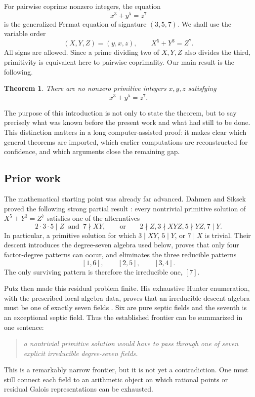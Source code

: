 \documentclass[11pt]{article}
\newtheorem{theorem}{Theorem}[section]
\theoremstyle{definition}
\theoremstyle{remark}
\begin{document}
For pairwise coprime nonzero integers, the equation
\begin{equation}\label{eq:original}
                         x^3+y^5=z^7
\end{equation}
is the generalized Fermat equation of signature $(3,5,7)$.  We shall use
the variable order
\begin{equation}\label{eq:DS-order}
                    (X,Y,Z)=(y,x,z),\qquad X^5+Y^3=Z^7.
\end{equation}
All signs are allowed.  Since a prime dividing two of $X,Y,Z$ also divides
the third, primitivity is equivalent here to pairwise coprimality.  Our main
result is the following.

\begin{theorem}\label{thm:main}
There are no nonzero primitive integers $x,y,z$ satisfying
\[
                             x^3+y^5=z^7.
\]
\end{theorem}

The purpose of this introduction is not only to state the theorem, but to
say precisely what was known before the present work and what had still to
be done.  This distinction matters in a long computer-assisted proof: it
makes clear which general theorems are imported, which earlier computations
are reconstructed for confidence, and which arguments close the remaining
gap.

\subsection{Prior work}

The mathematical starting point was already far advanced.  Dahmen and
Siksek proved the following strong partial result
\cite[Theorem~1]{DahmenSiksek}: every nontrivial primitive solution of
$X^5+Y^3=Z^7$ satisfies one of the alternatives
\begin{equation}\label{eq:DS-theorem-one}
 2\cdot3\cdot5\mid Z\ \text{ and }\ 7\nmid XY,
 \qquad\text{or}\qquad
 2\nmid Z, 3\nmid XYZ, 5\nmid YZ, 7\mid Y.
\end{equation}
In particular, a primitive solution for which $3\mid XY$, $5\mid Y$, or
$7\mid X$ is trivial.  Their descent introduces the degree-seven algebra
used below, proves that only four factor-degree patterns can occur, and
eliminates the three reducible patterns
\[
                         [1,6],\qquad[2,5],\qquad[3,4].
\]
The only surviving pattern is therefore the irreducible one, $[7]$.

Putz then made this residual problem finite.  His exhaustive Hunter
enumeration, with the prescribed local algebra data, proves that an
irreducible descent algebra must be one of exactly seven fields
\cite[Theorem~3.50]{Putz}.  Six are pure septic fields and the seventh is an
exceptional septic field.  Thus the established frontier can be summarized in
one sentence:
\begin{quote}
\emph{a nontrivial primitive solution would have to pass through one of seven
explicit irreducible degree-seven fields.}
\end{quote}
This is a remarkably narrow frontier, but it is not yet a contradiction.
One must still connect each field to an arithmetic object on which rational
points or residual Galois representations can be exhausted.
\end{document}
